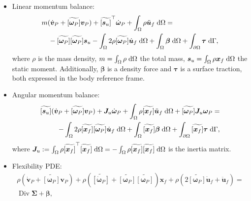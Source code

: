 \documentclass{svjour3}                     %
\DeclareMathOperator*{\Div}{Div}
\newcommand{\crmat}[1]{\ensuremath{\widetilde{\left[#1\right]}}}
\begin{document}
	\begin{itemize}
		\item Linear momentum balance:
		\begin{equation}
		\label{eq:rig_tr1}
		\begin{split}
		&m (\dot{\bm{v}}_P + \crmat{\bm{\omega}_P} \bm{v}_P) + \crmat{\bm{s}_u}^\top \dot{\bm{\omega}}_P  + \int_{\Omega} \rho \ddot{\bm{u}}_f \d{\Omega} = \\
		&\quad - \crmat{\bm{\omega}_P} \crmat{\bm{\omega}_P} \bm{s}_u - \int_{\Omega} 2 \rho \crmat{\bm{\omega}_P} \dot{\bm{u}}_f \d{\Omega} +  \int_{\Omega} \bm\beta \d{\Omega} + \int_{\partial \Omega} \bm\tau \d{\Gamma},
		\end{split}
		\end{equation}
		where $\rho$ is the mass density, $m = \int_{\Omega} \rho \d{\Omega}$ the total mass,  $\bm{s}_u = \int_{\Omega} \rho \bm{x}_f \d{\Omega}$ the static moment. Additionally, $\bm\beta$ is a density force and $\bm\tau$ is a surface traction, both expressed in the body reference frame.
		\item Angular momentum balance:
		\begin{equation}
		\label{eq:rig_rot1}
		\begin{split}
		\crmat{\bm{s}_u} (\dot{\bm{v}}_P + \crmat{\bm{\omega}_P} \bm{v}_P) + \bm{J}_u \dot{\bm\omega}_P + \int_{\Omega} \rho \crmat{\bm{x}_f} \ddot{\bm{u}}_f \d{\Omega} + \crmat{\bm{\omega}_P} \bm{J}_u \bm{\omega}_P = \\ 
		- \int_{\Omega} 2\rho \crmat{\bm{x}_f} \crmat{\bm\omega_P} \dot{\bm{u}}_f \d{\Omega} + \int_{\Omega}\crmat{\bm{x}_f} \bm\beta \d{\Omega} + \int_{\partial \Omega}\crmat{\bm{x}_f} \bm\tau \d{\Gamma}, \\
		\end{split}
		\end{equation}
		where $\bm{J}_u:= \int_{\Omega} \rho \crmat{\bm{x}_f}^\top\crmat{\bm{x}_f} \d{\Omega}= - \int_{\Omega} \rho \crmat{\bm{x}_f}\crmat{\bm{x}_f} \d{\Omega}$ is the inertia matrix.
		\item Flexibility PDE:
		\begin{equation}
		\label{eq:flex1}
		\begin{split}
		\rho (\dot{\bm{v}}_P + \crmat{\bm\omega_P} \bm{v}_P) + \rho (\crmat{\dot{\bm\omega}_P} + \crmat{\bm{\omega}_P}\crmat{\bm{\omega}_P})\bm{x}_f + \rho (2 \crmat{\bm{\omega}_P} \dot{\bm{u}}_f + \ddot{\bm{u}}_f) = \\
		\Div{\bm\Sigma} + \bm\beta,
		\end{split}

\end{equation}
\end{itemize}
\end{document}
